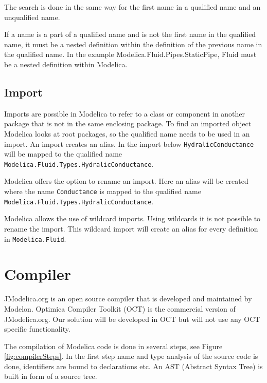 \documentclass{cslthse-msc}
\begin{document}
The search is done in the same way for the first name in a qualified name and an unqualified name.

If a name is a part of a qualified name and is not the first name in the qualified name, it must be a nested definition within the definition of the previous name in the qualified name. In the example Modelica.Fluid.Pipes.StaticPipe, Fluid must be a nested definition within Modelica.\cite{modelicamodelica, tillermodelica}

\subsection{Import}
Imports are possible in Modelica to refer to a class or component in another package that is not in the same enclosing package. To find an imported object Modelica looks at root packages, so the qualified name needs to be used in an import. An import creates an alias. In the import below \texttt{HydralicConductance} will be mapped to the qualified name \texttt{Modelica.Fluid.Types.HydralicConductance}.



Modelica offers the option to rename an import. Here an alias will be created where the name \texttt{Conductance} is mapped to the qualified name \texttt{Modelica.Fluid.Types.HydralicConductance}.



Modelica allows the use of wildcard imports. Using wildcards it is not possible to rename the import. This wildcard import will create an alias for every definition in \texttt{Modelica.Fluid}.



\section{Compiler}
JModelica.org is an open source compiler that is developed and maintained by Modelon. Optimica Compiler Toolkit (OCT) is the commercial version of JModelica.org. Our solution will be developed in OCT but will not use any OCT specific functionality. 

The compilation of Modelica code is done in several steps, see Figure \ref{fig:compilerSteps}. \cite{aakesson2010implementation} In the first step name and type analysis of the source code is done, identifiers are bound to declarations etc. An AST (Abstract Syntax Tree) is built in form of a source tree.
\end{document}
